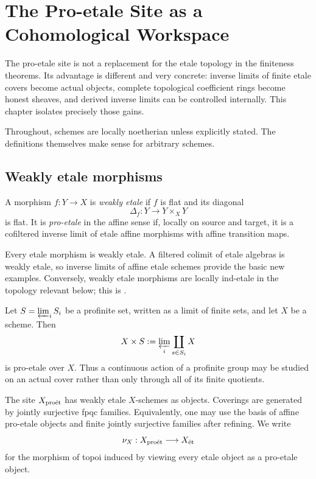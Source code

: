 \chapter{The Pro-etale Site as a Cohomological Workspace}
\label{chap:proetale-site}

The pro-etale site is not a replacement for the etale topology in the
finiteness theorems.  Its advantage is different and very concrete: inverse
limits of finite etale covers become actual objects, complete topological
coefficient rings become honest sheaves, and derived inverse limits can be
controlled internally.  This chapter isolates precisely those gains.

Throughout, schemes are locally noetherian unless explicitly stated.  The
definitions themselves make sense for arbitrary schemes.

\section{Weakly etale morphisms}

\begin{definition}
\label{def:weakly-etale}
A morphism \(f:Y\to X\) is \emph{weakly etale} if \(f\) is flat and its
diagonal
\[
  \Delta_f:Y\longrightarrow Y\times_XY
\]
is flat.  It is \emph{pro-etale} in the affine sense if, locally on source
and target, it is a cofiltered inverse limit of etale affine morphisms with
affine transition maps.
\end{definition}

Every etale morphism is weakly etale.  A filtered colimit of etale algebras
is weakly etale, so inverse limits of affine etale schemes provide the basic
new examples.  Conversely, weakly etale morphisms are locally ind-etale in
the topology relevant below; this is
\cite[Theorem~2.3.4]{BhattScholzeProEtale}.

\begin{example}
Let \(S=\varprojlim_i S_i\) be a profinite set, written as a limit of finite
sets, and let \(X\) be a scheme.  Then
\[
  X\times S:=\varprojlim_i \coprod_{s\in S_i}X
\]
is pro-etale over \(X\).  Thus a continuous action of a profinite group may
be studied on an actual cover rather than only through all of its finite
quotients.
\end{example}

\begin{definition}
\label{def:small-proetale-site}
The site \(X_{\mathrm{pro\acute et}}\) has weakly etale \(X\)-schemes as objects.  Coverings
are generated by jointly surjective fpqc families.  Equivalently, one may
use the basis of affine pro-etale objects and finite jointly surjective
families after refining.  We write
\[
  \nu_X:X_{\mathrm{pro\acute et}}\longrightarrow X_{\mathrm{\acute et}}
\]
for the morphism of topoi induced by viewing every etale object as a
pro-etale object.
\end{definition}

